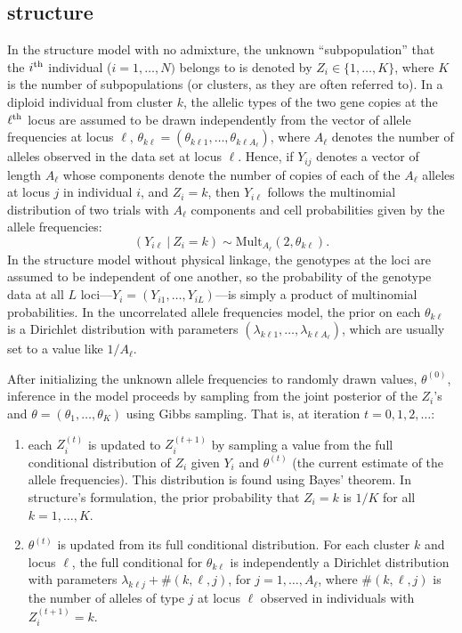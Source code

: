 \subsection*{{\sc structure}}
In the {\sc structure} model with no admixture, the unknown ``subpopulation'' that the 
$i^\mathrm{th}$ individual ($i=1,\ldots,N)$ belongs to is denoted by $Z_i \in \{1,\ldots,K\}$, 
where $K$ is the 
number of subpopulations (or clusters, as they are often referred to).  
In a diploid individual from cluster $k$, the 
allelic types of the two gene copies at the $\ell^\mathrm{th}$ locus are assumed
to be drawn independently from the vector of allele frequencies at
locus $\ell$,  $\theta_{k\ell}=(\theta_{k\ell 1},\ldots,\theta_{k\ell A_\ell})$, where 
$A_\ell$ 
denotes the number of alleles observed in the data set at locus $\ell$.
Hence, if $Y_{ij}$ denotes a vector of length $A_\ell$ whose components denote the 
number
of copies of each of the $A_\ell$ alleles at locus $j$ in individual $i$, and 
$Z_i=k$, then $Y_{i\ell}$ follows the multinomial distribution of two trials with
$A_\ell$  components and cell probabilities given by the allele frequencies: 
\begin{equation}
(Y_{i\ell}~|~Z_i=k) \sim \mathrm{Mult}_{A_\ell}(2, \theta_{k\ell}).
\end{equation}
In the {\sc structure} model without physical linkage, the genotypes at the loci are assumed to
be independent of one another, so the probability of the genotype data at
all $L$ loci---$Y_i=(Y_{i1},\ldots,Y_{iL})$---is simply a product of multinomial 
probabilities.
In the uncorrelated allele frequencies model, the prior on each $\theta_{k\ell}$ is a
Dirichlet distribution with parameters $(\lambda_{k\ell1},\ldots,\lambda_{k\ell A_
\ell})$,
which are usually set to a value like $1/A_\ell$.  

After initializing the unknown allele frequencies to randomly drawn values,
$\theta^{(0)}$, inference in the model proceeds by sampling from the joint posterior of the 
$Z_i$'s and $\theta = (\theta_1,\ldots,\theta_K)$ using Gibbs sampling.  That is,
at iteration $t = 0, 1, 2, \ldots$:
\begin{enumerate}
\item each $Z^{(t)}_i$ is updated to $Z^{(t+1)}_i$ by sampling a value from 
the full conditional distribution of $Z_i$ given
$Y_i$ and $\theta^{(t)}$ (the current estimate of the allele frequencies).  This
distribution is found using Bayes' theorem. In {\sc structure}'s formulation, the 
prior probability that $Z_i=k$ is $1/K$ for all $k=1,\ldots, K$.     
\item $\theta^{(t)}$ is updated from its full conditional distribution.  For each 
cluster
$k$ and locus $\ell$, the full conditional for $\theta_{k\ell}$ is independently a 
Dirichlet distribution with parameters $\lambda_{k\ell j} + \#(k,\ell,j)$, for 
$j=1,\ldots, A_\ell$,
where $\#(k,\ell,j)$ is the number of alleles of type $j$ at locus $\ell$ observed in 
individuals with $Z^{(t+1)}_i = k$.   
\end{enumerate}

